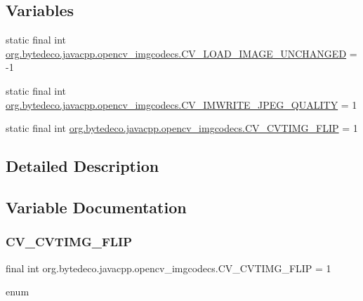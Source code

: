 \subsection*{Variables}
\begin{DoxyCompactItemize}
\item 
static final int \hyperlink{group__imgcodecs__c_ga98f1d87118e743ffeec57c7f3a10afd6}{org.\+bytedeco.\+javacpp.\+opencv\+\_\+imgcodecs.\+C\+V\+\_\+\+L\+O\+A\+D\+\_\+\+I\+M\+A\+G\+E\+\_\+\+U\+N\+C\+H\+A\+N\+G\+ED} = -\/1
\item 
static final int \hyperlink{group__imgcodecs__c_ga6359737e32478705e367f06a0a4d14b1}{org.\+bytedeco.\+javacpp.\+opencv\+\_\+imgcodecs.\+C\+V\+\_\+\+I\+M\+W\+R\+I\+T\+E\+\_\+\+J\+P\+E\+G\+\_\+\+Q\+U\+A\+L\+I\+TY} = 1
\item 
static final int \hyperlink{group__imgcodecs__c_ga9e58aa60c2a368479b56debeae227525}{org.\+bytedeco.\+javacpp.\+opencv\+\_\+imgcodecs.\+C\+V\+\_\+\+C\+V\+T\+I\+M\+G\+\_\+\+F\+L\+IP} = 1
\end{DoxyCompactItemize}


\subsection{Detailed Description}


\subsection{Variable Documentation}
\mbox{\label{group__imgcodecs__c_ga9e58aa60c2a368479b56debeae227525}} 
\subsubsection{\texorpdfstring{C\+V\+\_\+\+C\+V\+T\+I\+M\+G\+\_\+\+F\+L\+IP}{CV\_CVTIMG\_FLIP}}
{\footnotesize\ttfamily final int org.\+bytedeco.\+javacpp.\+opencv\+\_\+imgcodecs.\+C\+V\+\_\+\+C\+V\+T\+I\+M\+G\+\_\+\+F\+L\+IP = 1\hspace{0.3cm}{\ttfamily [static]}}

enum \mbox{\label{group__imgcodecs__c_ga6359737e32478705e367f06a0a4d14b1}} 
